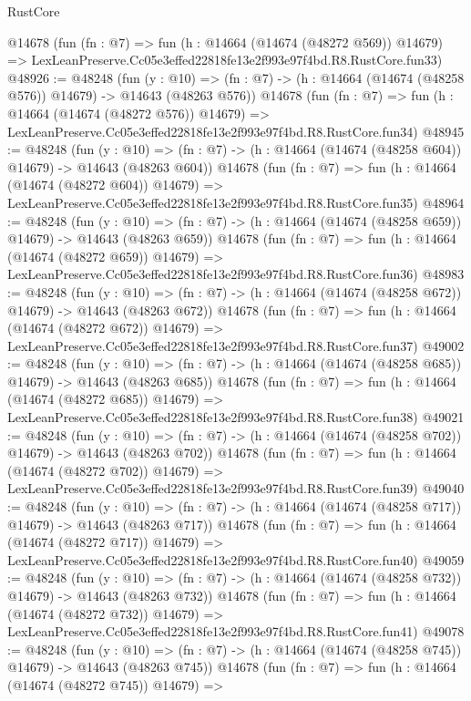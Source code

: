 \begin{lexlean}{RustCore}
\begin{coremodule}
    @14678
    (fun (fn : @7) =>
    fun (h : @14664 (@14674 (@48272 @569)) @14679) =>
    LexLeanPreserve.Cc05e3effed22818fe13e2f993e97f4bd.R8.RustCore.fun33)
@48926 := @48248
    (fun (y : @10) =>
    (fn : @7) -> (h : @14664 (@14674 (@48258 @576)) @14679) -> @14643 (@48263 @576))
    @14678
    (fun (fn : @7) =>
    fun (h : @14664 (@14674 (@48272 @576)) @14679) =>
    LexLeanPreserve.Cc05e3effed22818fe13e2f993e97f4bd.R8.RustCore.fun34)
@48945 := @48248
    (fun (y : @10) =>
    (fn : @7) -> (h : @14664 (@14674 (@48258 @604)) @14679) -> @14643 (@48263 @604))
    @14678
    (fun (fn : @7) =>
    fun (h : @14664 (@14674 (@48272 @604)) @14679) =>
    LexLeanPreserve.Cc05e3effed22818fe13e2f993e97f4bd.R8.RustCore.fun35)
@48964 := @48248
    (fun (y : @10) =>
    (fn : @7) -> (h : @14664 (@14674 (@48258 @659)) @14679) -> @14643 (@48263 @659))
    @14678
    (fun (fn : @7) =>
    fun (h : @14664 (@14674 (@48272 @659)) @14679) =>
    LexLeanPreserve.Cc05e3effed22818fe13e2f993e97f4bd.R8.RustCore.fun36)
@48983 := @48248
    (fun (y : @10) =>
    (fn : @7) -> (h : @14664 (@14674 (@48258 @672)) @14679) -> @14643 (@48263 @672))
    @14678
    (fun (fn : @7) =>
    fun (h : @14664 (@14674 (@48272 @672)) @14679) =>
    LexLeanPreserve.Cc05e3effed22818fe13e2f993e97f4bd.R8.RustCore.fun37)
@49002 := @48248
    (fun (y : @10) =>
    (fn : @7) -> (h : @14664 (@14674 (@48258 @685)) @14679) -> @14643 (@48263 @685))
    @14678
    (fun (fn : @7) =>
    fun (h : @14664 (@14674 (@48272 @685)) @14679) =>
    LexLeanPreserve.Cc05e3effed22818fe13e2f993e97f4bd.R8.RustCore.fun38)
@49021 := @48248
    (fun (y : @10) =>
    (fn : @7) -> (h : @14664 (@14674 (@48258 @702)) @14679) -> @14643 (@48263 @702))
    @14678
    (fun (fn : @7) =>
    fun (h : @14664 (@14674 (@48272 @702)) @14679) =>
    LexLeanPreserve.Cc05e3effed22818fe13e2f993e97f4bd.R8.RustCore.fun39)
@49040 := @48248
    (fun (y : @10) =>
    (fn : @7) -> (h : @14664 (@14674 (@48258 @717)) @14679) -> @14643 (@48263 @717))
    @14678
    (fun (fn : @7) =>
    fun (h : @14664 (@14674 (@48272 @717)) @14679) =>
    LexLeanPreserve.Cc05e3effed22818fe13e2f993e97f4bd.R8.RustCore.fun40)
@49059 := @48248
    (fun (y : @10) =>
    (fn : @7) -> (h : @14664 (@14674 (@48258 @732)) @14679) -> @14643 (@48263 @732))
    @14678
    (fun (fn : @7) =>
    fun (h : @14664 (@14674 (@48272 @732)) @14679) =>
    LexLeanPreserve.Cc05e3effed22818fe13e2f993e97f4bd.R8.RustCore.fun41)
@49078 := @48248
    (fun (y : @10) =>
    (fn : @7) -> (h : @14664 (@14674 (@48258 @745)) @14679) -> @14643 (@48263 @745))
    @14678
    (fun (fn : @7) =>
    fun (h : @14664 (@14674 (@48272 @745)) @14679) =>

\end{coremodule}
\end{lexlean}
